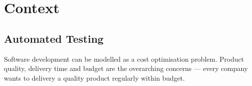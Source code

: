 \section{Context}
\label{sec:context}



\subsection{Automated Testing}

Software development can be modelled as a cost optimisation problem. Product quality, delivery time and budget are the overarching concerns --- every company wants to delivery a quality product regularly within budget.

